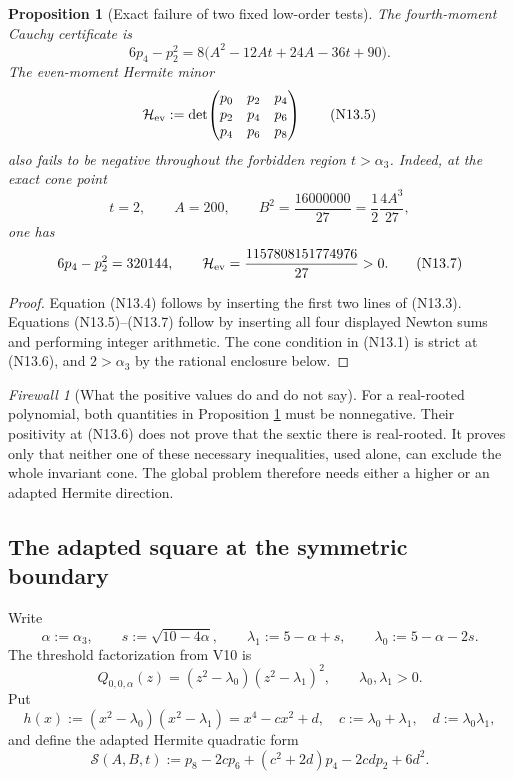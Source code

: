 \documentclass[11pt]{article}
\newtheorem{proposition}[theorem]{Proposition}
\theoremstyle{definition}
\theoremstyle{remark}
\newtheorem{firewall}[theorem]{Firewall}
\begin{document}
\begin{proposition}[Exact failure of two fixed low-order tests]
\label{prop:f2v13-minor-failure}
The fourth-moment Cauchy certificate is
\[
 6p_4-p_2^2
 =8\bigl(A^2-12At+24A-36t+90\bigr).
 \tag{N13.4}
\]
The even-moment Hermite minor
\[
 \mathcal H_{\rm ev}:=
 \det\!\begin{pmatrix}
 p_0&p_2&p_4\\ p_2&p_4&p_6\\ p_4&p_6&p_8
 \end{pmatrix}
 \tag{N13.5}
\]
also fails to be negative throughout the forbidden region \(t>\alpha _3\).
Indeed, at the exact cone point
\[
 t=2,\qquad A=200,\qquad B^2=\frac{16000000}{27}
       =\frac12\frac{4A^3}{27},
 \tag{N13.6}
\]
one has
\[
 6p_4-p_2^2=320144,
 \qquad
 \mathcal H_{\rm ev}=\frac{1157808151774976}{27}>0.
 \tag{N13.7}
\]
\end{proposition}

\begin{proof}
Equation \textup{(N13.4)} follows by inserting the first two lines of
\textup{(N13.3)}.  Equations \textup{(N13.5)}--\textup{(N13.7)} follow by
inserting all four displayed Newton sums and performing integer arithmetic.
The cone condition in \textup{(N13.1)} is strict at \textup{(N13.6)}, and
\(2>\alpha _3\) by the rational enclosure below.
\end{proof}

\begin{firewall}[What the positive values do and do not say]
For a real-rooted polynomial, both quantities in Proposition
\ref{prop:f2v13-minor-failure} must be nonnegative.  Their positivity at
\textup{(N13.6)} does not prove that the sextic there is real-rooted.  It
proves only that neither one of these necessary inequalities, used alone,
can exclude the whole invariant cone.  The global problem therefore needs
either a higher or an adapted Hermite direction.
\end{firewall}

\subsection{The adapted square at the symmetric boundary}

Write
\[
 \alpha:=\alpha _3,
 \qquad s:=\sqrt{10-4\alpha},
 \qquad
 \lambda _1:=5-\alpha+s,
 \qquad
 \lambda _0:=5-\alpha-2s.
 \tag{N13.8}
\]
The threshold factorization from V10 is
\[
 Q_{0,0,\alpha}(z)
 =(z^2-\lambda _0)(z^2-\lambda _1)^2,
 \qquad \lambda _0,\lambda _1>0.
 \tag{N13.9}
\]
Put
\[
 h(x):=(x^2-\lambda _0)(x^2-\lambda _1)
      =x^4-cx^2+d,
 \quad c:=\lambda _0+\lambda _1,
 \quad d:=\lambda _0\lambda _1,
 \tag{N13.10}
\]
and define the adapted Hermite quadratic form
\[
 \mathcal S(A,B,t)
 :=p_8-2cp_6+(c^2+2d)p_4-2cdp_2+6d^2.
 \tag{N13.11}
\]
\end{document}
